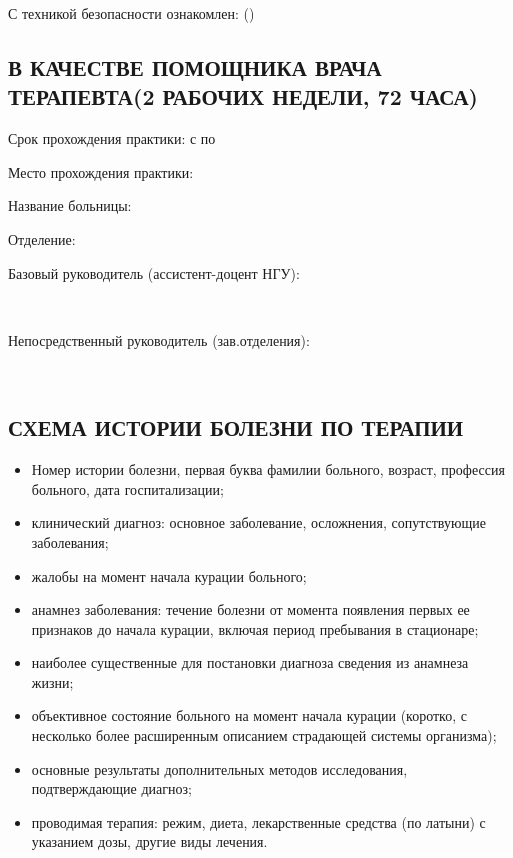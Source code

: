 \documentclass[a4paper,14pt]{extarticle}
\begin{document}
\begin{enumerate}
                                                                                                      \end{enumerate}
С техникой безопасности ознакомлен: \hrulefill (\hrulefill)\\

\subsection*{В КАЧЕСТВЕ ПОМОЩНИКА ВРАЧА ТЕРАПЕВТА(2 РАБОЧИХ НЕДЕЛИ, 72 ЧАСА)}


Срок прохождения практики: с \hrulefill по \hrulefill

Место прохождения практики: \hrulefill

Название больницы: \hrulefill

Отделение: \hrulefill

Базовый руководитель (ассистент-доцент НГУ): \hrulefill

~\hrulefill

Непосредственный руководитель (зав.отделения): \hrulefill

~\hrulefill

\subsection*{СХЕМА ИСТОРИИ БОЛЕЗНИ ПО ТЕРАПИИ}

\begin{itemize}
\item Номер истории  болезни,  первая  буква  фамилии  больного,  возраст,  профессия больного, дата госпитализации;
\item клинический  диагноз:  основное  заболевание,  осложнения,  сопутствующие заболевания;
\item жалобы на момент начала курации больного;
\item анамнез заболевания: течение болезни от момента появления первых ее признаков до начала курации, включая период пребывания в стационаре;
\item наиболее существенные для постановки диагноза сведения из анамнеза жизни;
\item объективное состояние больного на момент начала курации (коротко, с несколько более расширенным описанием страдающей системы организма);
\item основные результаты дополнительных методов исследования, подтверждающие диагноз;
\item проводимая  терапия:  режим,  диета,  лекарственные  средства  (по  латыни)  с указанием дозы, другие виды лечения.\end{itemize}
\end{document}
